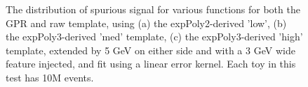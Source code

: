 \begin{figure} 
\begin{center}

\caption{The distribution of spurious signal for various functions for both the GPR and raw template, using (a) the expPoly2-derived 'low', (b) the expPoly3-derived 'med' template, (c) the expPoly3-derived 'high' template, extended by 5 GeV on either side and with a 3 GeV wide feature injected, and fit using a linear error kernel. Each toy in this test has 10M events.}
\label{fig:linearkernel_lowpt_10M_Sig}
\end{center}
\end{figure}

